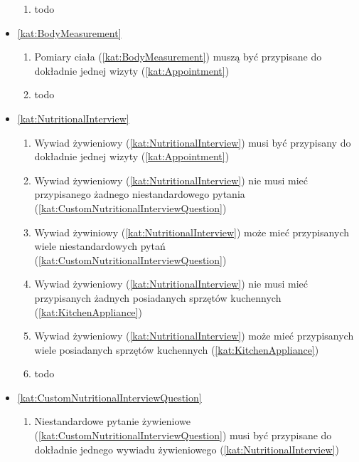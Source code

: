 \begin{itemize}[label={\textbf{Reguły dla}}, wide, labelwidth=!, labelindent=0pt]
\begin{enumerate}[label={\textbf{REG/\protect\threedigits{\arabic{enumi}}}}, wide, labelwidth=!, align=left, leftmargin=3cm, resume]
        \item todo
    \end{enumerate}
    \item\ref{kat:BodyMeasurement}
    \begin{enumerate}[label={\textbf{REG/\protect\threedigits{\arabic{enumi}}}}, wide, labelwidth=!, align=left, leftmargin=3cm, resume]
        \item Pomiary ciała (\ref{kat:BodyMeasurement}) muszą być przypisane do dokładnie jednej wizyty (\ref{kat:Appointment})
        \item todo
    \end{enumerate}
    \item\ref{kat:NutritionalInterview}
    \begin{enumerate}[label={\textbf{REG/\protect\threedigits{\arabic{enumi}}}}, wide, labelwidth=!, align=left, leftmargin=3cm, resume]
        \item Wywiad żywieniowy (\ref{kat:NutritionalInterview}) musi być przypisany do dokładnie jednej wizyty (\ref{kat:Appointment})
        \item Wywiad żywieniowy (\ref{kat:NutritionalInterview}) nie musi mieć przypisanego żadnego niestandardowego pytania (\ref{kat:CustomNutritionalInterviewQuestion})
        \item Wywiad żywiniowy (\ref{kat:NutritionalInterview}) może mieć przypisanych wiele niestandardowych pytań (\ref{kat:CustomNutritionalInterviewQuestion})
        \item Wywiad żywieniowy (\ref{kat:NutritionalInterview}) nie musi mieć przypisanych żadnych posiadanych sprzętów kuchennych (\ref{kat:KitchenAppliance})
        \item Wywiad żywieniowy (\ref{kat:NutritionalInterview}) może mieć przypisanych wiele posiadanych sprzętów kuchennych (\ref{kat:KitchenAppliance})
        \item todo
    \end{enumerate}
    \item\ref{kat:CustomNutritionalInterviewQuestion}
    \begin{enumerate}[label={\textbf{REG/\protect\threedigits{\arabic{enumi}}}}, wide, labelwidth=!, align=left, leftmargin=3cm, resume]
        \item Niestandardowe pytanie żywieniowe (\ref{kat:CustomNutritionalInterviewQuestion}) musi być przypisane do dokładnie jednego wywiadu żywieniowego (\ref{kat:NutritionalInterview})

\end{enumerate}
\end{itemize}
